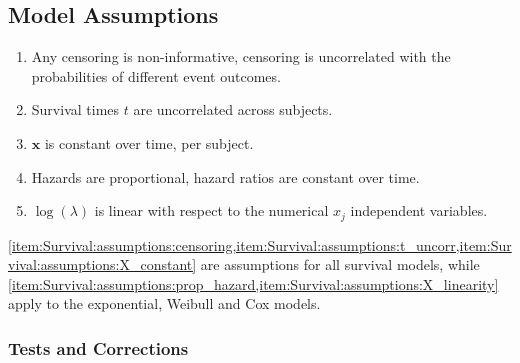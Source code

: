 \subsection{Model Assumptions}
\label{additional:Survival:assumptions}

\begin{enumerate}[noitemsep]
\item Any censoring is non-informative, \ie censoring is uncorrelated with the probabilities of different event outcomes.\label{item:Survival:assumptions:censoring}
\item Survival times $t$ are uncorrelated across subjects.\label{item:Survival:assumptions:t_uncorr}
\item $\mathbf{x}$ is constant over time, per subject.\label{item:Survival:assumptions:X_constant}
\item Hazards are proportional, \ie hazard ratios are constant over time.\label{item:Survival:assumptions:prop_hazard}
\item $\log\left(\lambda\right)$ is linear with respect to the numerical $x_{j}$ independent variables.\label{item:Survival:assumptions:X_linearity}
\end{enumerate}

\cref{item:Survival:assumptions:censoring,item:Survival:assumptions:t_uncorr,item:Survival:assumptions:X_constant}
are assumptions for all survival models, while
\cref{item:Survival:assumptions:prop_hazard,item:Survival:assumptions:X_linearity}
apply to the exponential, Weibull and Cox models.

\subsubsection{Tests and Corrections}
\label{additional:Survival:assumptions:tests_and_corrections}


